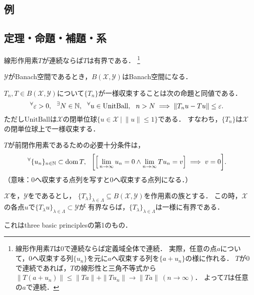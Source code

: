 \documentclass[a4j]{jsarticle}
\newcommand{\spX}{\mathscr{X}}
\newcommand{\spY}{\mathscr{Y}}
\newcommand{\spB}[2]{B(\mathscr{#1}, \mathscr{#2})}
\begin{document}
    \subsection{例}

    \subsection{定理・命題・補題・系}
    \begin{Thm}[定理7.1, p.148] \label{them7:1}
        線形作用素$T$が連続ならば$T$は有界である．
        \footnote{線形作用素$T$は0で連続ならば定義域全体で連続．
        実際，任意の点$a$について，0へ収束する列$\{u_n\}$を元に$a$へ収束する列を$\{a+u_n\}$の様に作れる．
        $T$が0で連続であれば，$T$の線形性と三角不等式から$\|T(a+u_n)\| \leq \|Ta\|+\|Tu_n\| \to \|Ta\|~(n \to \infty)$．
        よって$T$は任意の$a$で連続．}
    \end{Thm}

    \begin{Thm}[定理7.6, p.150] \label{them7:6}
        $\spY$がBanach空間であるとき，$\spB{X}{Y}$はBanach空間になる．
    \end{Thm}

    \begin{Thm}[定理7.8, p.153] \label{them7:8}
        $T_n, T \in \spB{X}{Y}$について$\{T_n\}$が一様収束することは次の命題と同値である．
        \[ {}^{\forall} \varepsilon>0,~~ {}^{\exists} N \in \mathbb{N},~~ {}^{\forall} u \in \mathrm{UnitBall},~~ n>N \implies \| T_n u-T u \| \leq \varepsilon. \]
        ただし$\mathrm{UnitBall}$は$\spX$の閉単位球$\{u \in \spX ~|~ \|u\| \leq 1\}$である．
        すなわち，$\{T_n\}$は$\spX$の閉単位球上で一様収束する．
    \end{Thm}

    \begin{Thm}[定理7.20 (i), p.166] \label{them7:20}
        $T$が前閉作用素であるための必要十分条件は，
        \[ {}^{\forall} \{ u_n \}_{n \in \mathbb{N}} \subset \operatorname{dom} T,~~ \bigg[\Big[\lim_{n \to \infty}u_n=0  \land \lim_{n \to \infty}Tu_n=v \Big] \implies v=0 \bigg]. \]
        （意味：0へ収束する点列を写すと0へ収束する点列になる．）
    \end{Thm}

    \begin{Thm}[定理7.21, p.166, 一様有界性の原理] \label{them7:21}
        $\spX$を，$\spY$をであるとし，
        $\{ T_{\lambda} \}_{\lambda \in \Lambda} \subseteq \spB{X}{Y}$を作用素の族とする．
        この時，$\spX$の各点$u$で$\{ T_{\lambda}u \}_{\lambda \in \Lambda} \subset \spY$が
        有界ならば，$\{ T_{\lambda} \}_{\lambda \in \Lambda}$は一様に有界である．
    \end{Thm}
    これはthree basic principlesの第1のもの．
\end{document}
